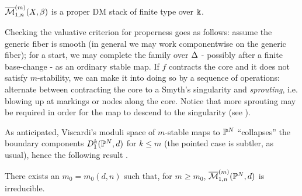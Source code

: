 \begin{prop}\label{prop:Visc-properness}\cite[Theorem 3.6]{VISC}
 $\overline{\mathcal{M}}^{(m)}_{1,n}(X,\beta)$ is a proper DM stack of finite type over $\Bbbk$.
\end{prop}
Checking the valuative criterion for properness goes as follows: assume the generic fiber is smooth (in general we may work componentwise on the generic fiber); for a start, we may complete the family over $\Delta$ - possibly after a finite base-change - as an ordinary stable map. If $f$ contracts the core and it does not satisfy $m$-stability, we can make it into doing so by a sequence of operations: alternate between contracting the core to a Smyth's singularity and \emph{sprouting}, i.e. blowing up at markings or nodes along the core. Notice that more sprouting may be required in order for the map to descend to the singularity (see \cite[Remark 2.6]{BCM}).

As anticipated, Viscardi's moduli space of $m$-stable maps to $\mathbb P^N$ ``collapses'' the boundary components $D^k_1(\mathbb P^N,d)$ for $k\leq m$ (the pointed case is subtler, as usual), hence the following result \cite[Corollary 5.10]{VISC}.
\begin{prop}
 There exists an $m_0=m_0(d,n)$ such that, for $m\geq m_0$, $\overline{\mathcal{M}}^{(m)}_{1,n}(\mathbb P^N,d)$ is irreducible.
\end{prop}
